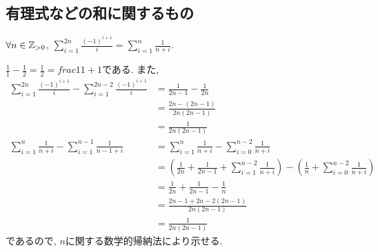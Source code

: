 \subsection{有理式などの和に関するもの}
\begin{prop}
  \label{p:20230726}
  $\forall n \in \mathbb{Z}_{>0}$,
  $\sum_{i=1}^{2n}\frac{(-1)^{i+1}}{i}=\sum_{i=1}^n\frac{1}{n+i}$.
\end{prop}
\begin{proof**}
  $\frac{1}{1}-\frac{1}{2}=\frac{1}{2}=frac{1}{1+1}$である.
  また,
  \begin{align*}
    \sum_{i=1}^{2n}\frac{(-1)^{i+1}}{i}-\sum_{i=1}^{2n-2}\frac{(-1)^{i+1}}{i}
    &=\frac{1}{2n-1}-\frac{1}{2n}\\
    &=\frac{2n-(2n-1)}{2n(2n-1)}\\
    &=\frac{1}{2n(2n-1)}\\
    \sum_{i=1}^n\frac{1}{n+i}-\sum_{i=1}^{n-1}\frac{1}{n-1+i}
    &=\sum_{i=1}^n\frac{1}{n+i}-\sum_{i=0}^{n-2}\frac{1}{n+i}\\
    &=(\frac{1}{2n}+\frac{1}{2n-1}+\sum_{i=1}^{n-2}\frac{1}{n+i})
    -(\frac{1}{n}+\sum_{i=0}^{n-2}\frac{1}{n+i})\\
    &=\frac{1}{2n}+\frac{1}{2n-1}-\frac{1}{n}\\
    &=\frac{2n-1+2n-2(2n-1)}{2n(2n-1)}\\
    &=\frac{1}{2n(2n-1)}
  \end{align*}
  であるので,
  $n$に関する数学的帰納法により示せる.
\end{proof**}
